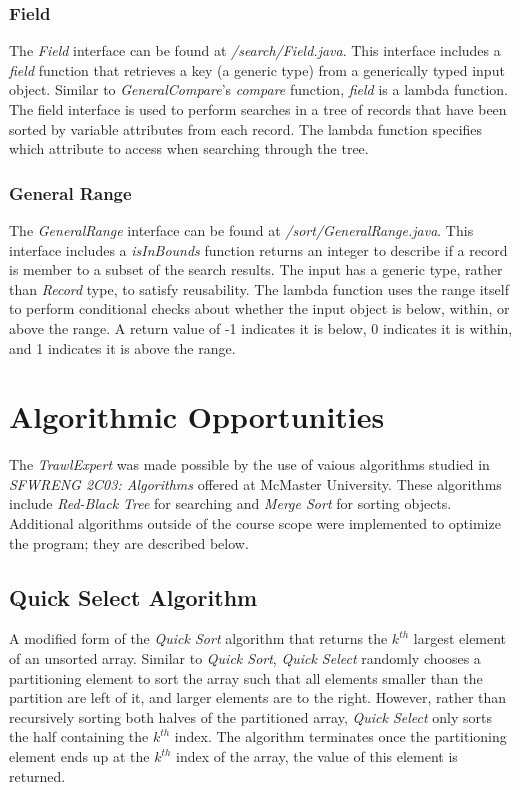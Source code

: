 \documentclass{article}
\begin{document}
\subsubsection{Field}
The \textit{Field} interface can be found at \textit{/search/Field.java}. This interface includes a \textit{field} function that retrieves a key (a generic type) from a generically typed input object. Similar to \textit{GeneralCompare}'s \textit{compare} function, \textit{field} is a lambda function. The field interface is used to perform searches in a tree of records that have been sorted by variable attributes from each record. The lambda function specifies which attribute to access when searching through the tree.

\subsubsection{General Range}
The \textit{GeneralRange} interface can be found at \textit{/sort/GeneralRange.java}. This interface includes a \textit{isInBounds} function returns an integer to describe if a record is member to a subset of the search results. The input has a generic type, rather than \textit{Record} type, to satisfy reusability. The lambda function uses the range itself to perform conditional checks about whether the input object is below, within, or above the range. A return value of -1 indicates it is below, 0 indicates it is within, and 1 indicates it is above the range.




\section{Algorithmic Opportunities}
The \textit{TrawlExpert} was made possible by the use of vaious algorithms studied in \textit{SFWRENG 2C03: Algorithms} offered at McMaster University. These algorithms include \textit{Red-Black Tree} for searching and \textit{Merge Sort} for sorting objects. Additional algorithms outside of the course scope were implemented to optimize the program; they are described below. 

\subsection{Quick Select Algorithm}
A modified form of the \textit{Quick Sort} algorithm that returns the $k^{th}$ largest element of an unsorted array. Similar to \textit{Quick Sort}, \textit{Quick Select} randomly chooses a partitioning element to sort the array such that all elements smaller than the partition are left of it, and larger elements are to the right. However, rather than recursively sorting both halves of the partitioned array, \textit{Quick Select} only sorts the half containing the $k^{th}$ index. The algorithm terminates once the partitioning element ends up at the $k^{th}$ index of the array, the value of this element is returned.
\end{document}
